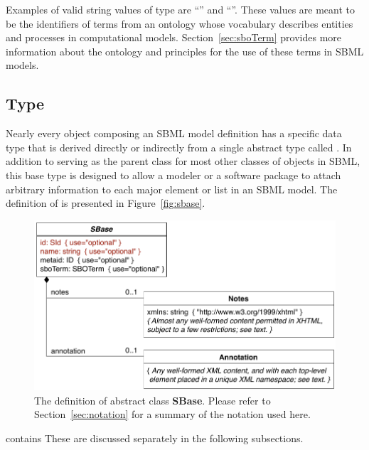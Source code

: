 Examples of valid string values of type  are
``'' and ``''.  These values
are meant to be the identifiers of terms from an ontology whose
vocabulary describes entities and processes in computational
models.  Section~\ref{sec:sboTerm} provides more information about
the ontology and principles for the use of these terms in SBML
models.


\subsection{Type }
\label{sec:sbase}

Nearly every object composing an SBML \thisL model definition has
a specific data type that is derived directly or indirectly from a
single abstract type called \SBase.  In addition to serving as the
parent class for most other classes of objects in SBML, this base
type is designed to allow a modeler or a software package to
attach arbitrary information to each major element or list in an
SBML model.  The definition of \SBase is presented in
Figure~\vref{fig:sbase}.

\begin{figure}[hbt]
  \centering
  \small
  \includegraphics[scale=0.8]{figs/sbase-uml}
  \caption{The definition of abstract class \textup{\textbf{\textsf{SBase}}}.  Please refer
    to Section~\protect\ref{sec:notation} for a summary of the
    notation used here.}
  \label{fig:sbase}
\end{figure}

\SBase contains   These are discussed separately in the following
subsections.


